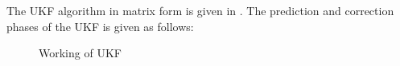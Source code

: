 \begin{comment}
The UKF have all the steps as in the Kalman Filter. The continuous time non linear system with additive white noises $v(t),w(t)$ is as follows \citep{sim07}:
\begin{equation}
    \label{eq:ukf_nlsys}
    \begin{split}
       \frac{dx}{dt} &= f(x(t),u(t),t) + W(t)w(t) \\
       y(t) &= h(x(t),u(t),t) + V(t)v(t),
    \end{split}
\end{equation} 
where $W(t),V(t)$ are arbitrary time varying matrices independent of $x(t)$ and $y(t)$. For sake of simplicity we assume the white noises $v(t),w(t)$  are uncorrelated, so the matrices $W(t),V(t)$ are assumed as identity matrices. The difference between UKF and EKF is in the method used for computation of the state covariance $P_k$. The state covariance of the priori state estimate $\hat x_k^-$ projected ahead of time is $$ P_k^- = \sum \limits_{i=0}^{2n} W_i^c [\hat x_{i,k}^- - \hat{\bar x}_k^-] [\hat x_{i,k}^- - \hat{\bar x}_k^-]^T + Q. $$
Similarly the covariance matrix $\Sigma_{\hat y_k}$ after projecting the priori estimates through the nonlinear function is $$ \Sigma_{\hat y} = \sum \limits_{i=0}^n W_i^c [\hat{y}_{k,i} - \hat{\bar y}_k ] [ \hat{y}_{k,i} - \hat{\bar y}_k] ^T+R.$$
The cross covariance matrix $\Sigma_{\hat x_k^-, \hat y_k}$ is $$ \Sigma_{\hat x_k^- \hat y_k} = \sum \limits_{i=0}^{2n} W_i^c [\hat x_{k,i}^- - \hat{\bar x}_k^- ] [ \hat y_{k,i} - \hat{\bar y}_k] ^T .$$
The Kalman gain $K_k$ is $$K_k = \Sigma_{\hat{\bar x}_k^- \hat y_k} \Sigma_{\hat y_k}^{-1}.$$
The state and covariance are updated according to the following equations:
$$  \begin{aligned}
    \hat{\bar{x}}_k &= \hat{\bar{x}}_k^- + K_k(y_k - \hat{\bar y}_k)\\
    P_k &= P_k^- - K_k \Sigma_{y,k} K_k^T.
    \end{aligned}
    $$
\end{comment}
The UKF algorithm in matrix form is given in \citep{sim07}. The prediction and correction phases of the UKF is given as follows:
\begin{figure}[H] 
    \centering
    
    \caption{Working of UKF}
    \label{fig:ukf_blk}
\end{figure}

